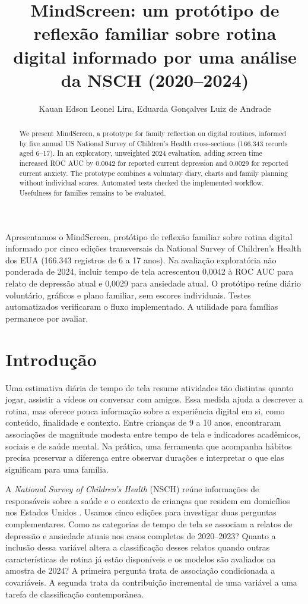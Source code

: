 ﻿\documentclass[12pt]{article}
\title{MindScreen: um protótipo de reflexão familiar sobre rotina digital informado por uma análise da NSCH (2020--2024)}
\author{Kauan Edson Leonel Lira\inst{1}, Eduarda Gonçalves Luiz de Andrade\inst{1}}
\begin{document}
\maketitle
\begin{abstract}
We present MindScreen, a prototype for family reflection on digital routines, informed by five annual US National Survey of Children's Health cross-sections (166,343 records aged 6--17). In an exploratory, unweighted 2024 evaluation, adding screen time increased ROC AUC by 0.0042 for reported current depression and 0.0029 for reported current anxiety. The prototype combines a voluntary diary, charts and family planning without individual scores. Automated tests checked the implemented workflow. Usefulness for families remains to be evaluated.
\end{abstract}
\begin{resumo}
Apresentamos o MindScreen, protótipo de reflexão familiar sobre rotina digital informado por cinco edições transversais da National Survey of Children's Health dos EUA (166.343 registros de 6 a 17 anos). Na avaliação exploratória não ponderada de 2024, incluir tempo de tela acrescentou 0,0042 à ROC AUC para relato de depressão atual e 0,0029 para ansiedade atual. O protótipo reúne diário voluntário, gráficos e plano familiar, sem escores individuais. Testes automatizados verificaram o fluxo implementado. A utilidade para famílias permanece por avaliar.
\end{resumo}

\section{Introdução}
Uma estimativa diária de tempo de tela resume atividades tão distintas quanto jogar, assistir a vídeos ou conversar com amigos. Essa medida ajuda a descrever a rotina, mas oferece pouca informação sobre a experiência digital em si, como conteúdo, finalidade e contexto. Entre crianças de 9 a 10 anos, \cite{paulich2021} encontraram associações de magnitude modesta entre tempo de tela e indicadores acadêmicos, sociais e de saúde mental. Na prática, uma ferramenta que acompanha hábitos precisa preservar a diferença entre observar durações e interpretar o que elas significam para uma família.

A \textit{National Survey of Children's Health} (NSCH) reúne informações de responsáveis sobre a saúde e o contexto de crianças que residem em domicílios nos Estados Unidos \cite{censusdata,censusguide}. Usamos cinco edições para investigar duas perguntas complementares. Como as categorias de tempo de tela se associam a relatos de depressão e ansiedade atuais nos casos completos de 2020--2023? Quanto a inclusão dessa variável altera a classificação desses relatos quando outras características de rotina já estão disponíveis e os modelos são avaliados na amostra de 2024? A primeira pergunta trata de associação condicionada a covariáveis. A segunda trata da contribuição incremental de uma variável a uma tarefa de classificação contemporânea.
\end{document}
